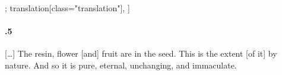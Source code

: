 \begin{alignment}[
  texts=edition[class="edition"];
  translation[class="translation"],
  ]
\begin{translation}
\begin{tlate}[21_5]
      \paragraph{.5} [\ldots] The resin, flower [and] fruit are in the seed. This is the extent [of it] by nature. And so it is pure, eternal, unchanging, and immaculate.
    \end{tlate}
\end{translation}
\end{alignment}
\pagebreak %
